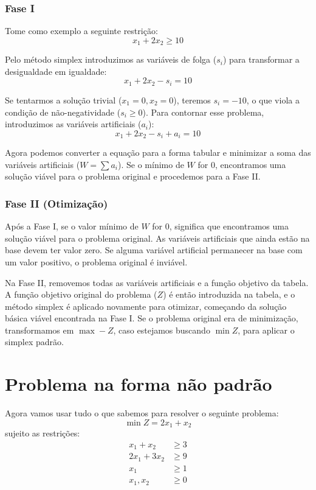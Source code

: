 \documentclass[12pt, a4paper]{article}
\begin{document}
\subsubsection*{Fase I}
Tome como exemplo a seguinte restrição:
\begin{equation*}
  x_1 + 2x_2 \ge 10
\end{equation*}

Pelo método simplex introduzimos as variáveis de folga ($s_i$) para transformar a desigualdade em igualdade:
\begin{equation*}
  x_1 + 2x_2 - s_i = 10
\end{equation*}

Se tentarmos a solução trivial ($x_1=0, x_2=0$), teremos $s_i = -10$, o que viola a condição de não-negatividade ($s_i \ge 0$). Para contornar esse problema, introduzimos as variáveis artificiais ($a_i$):
\begin{equation*}
  x_1 + 2x_2 - s_i + a_i = 10
\end{equation*}

Agora podemos converter a equação para a forma tabular e minimizar a soma das variáveis artificiais ($W = \sum a_i$). Se o mínimo de $W$ for 0, encontramos uma solução viável para o problema original e procedemos para a Fase II.

\subsubsection*{Fase II (Otimização)}
Após a Fase I, se o valor mínimo de $W$ for 0, significa que encontramos uma solução viável para o problema original. As variáveis artificiais que ainda estão na base devem ter valor zero. Se alguma variável artificial permanecer na base com um valor positivo, o problema original é inviável.

Na Fase II, removemos todas as variáveis artificiais e a função objetivo da tabela. A função objetivo original do problema ($Z$) é então introduzida na tabela, e o método simplex é aplicado novamente para otimizar, começando da solução básica viável encontrada na Fase I. Se o problema original era de minimização, transformamos em $\max -Z$, caso estejamos buscando $\min Z$, para aplicar o simplex padrão.

\cleardoublepage
\section[Problema 1]{Problema na forma não padrão}
Agora vamos usar tudo o que sabemos para resolver o seguinte problema:
\begin{equation*}
    \min Z = 2x_1 + x_2
\end{equation*}
sujeito as restrições:
\begin{align*}
  x_1  +  x_2 &\ge 3 \\
  2x_1 + 3x_2 &\ge 9 \\
  x_1        &\ge 1 \\
  x_1,  x_2  &\ge 0
\end{align*}
\end{document}
